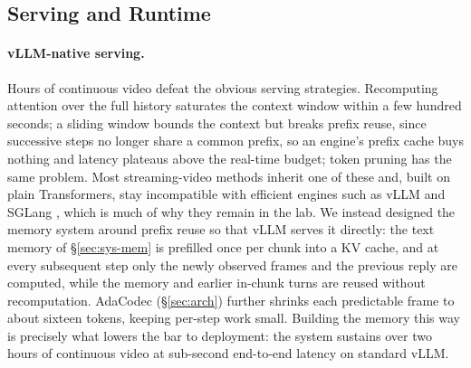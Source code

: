 

\subsection{Serving and Runtime}\label{sec:sys-serve}
\paragraph{\textbf{vLLM-native serving.}}
Hours of continuous video defeat the obvious serving strategies. Recomputing attention over the full history saturates the context window within a few hundred seconds; a sliding window bounds the context but breaks prefix reuse, since successive steps no longer share a common prefix, so an engine's prefix cache buys nothing and latency plateaus above the real-time budget; token pruning has the same problem. Most streaming-video methods inherit one of these and, built on plain Transformers, stay incompatible with efficient engines such as vLLM \cite{kwon2023efficientmemorymanagementlarge} and SGLang \cite{zheng2024sglangefficientexecutionstructured}, which is much of why they remain in the lab. We instead designed the memory system around prefix reuse so that vLLM serves it directly: the text memory of §\ref{sec:sys-mem} is prefilled once per chunk into a KV cache, and at every subsequent step only the newly observed frames and the previous reply are computed, while the memory and earlier in-chunk turns are reused without recomputation. AdaCodec (§\ref{sec:arch}) further shrinks each predictable frame to about sixteen tokens, keeping per-step work small. Building the memory this way is precisely what lowers the bar to deployment: the system sustains over two hours of continuous video at sub-second end-to-end latency on standard vLLM. 

